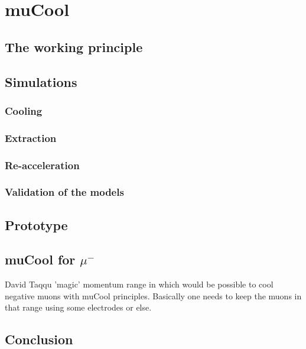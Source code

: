 \chapter{muCool}
\begin{refsection}

\section{The working principle}
\section{Simulations}
\subsection{Cooling}
\subsection{Extraction}
\subsection{Re-acceleration}
\subsection{Validation of the models}
\section{Prototype}
\section{muCool for $\mu^-$}
David Taqqu 'magic' momentum range in which would be possible to cool negative muons with muCool principles. Basically one needs to keep the muons in that range using some electrodes or else.
\section{Conclusion}




\cite{muCool:Taqqu:2006} \cite{muCool:Bao:2014} \cite{muCool:Andreas:2015} \cite{muCool:2018} \cite{muCool:2019} \cite{muCool:Angela:2019} \cite{muCool:2020}

\printbibliography[
    heading = bibliographychapter,
    title=Bibliography on muCool
]

\end{refsection}